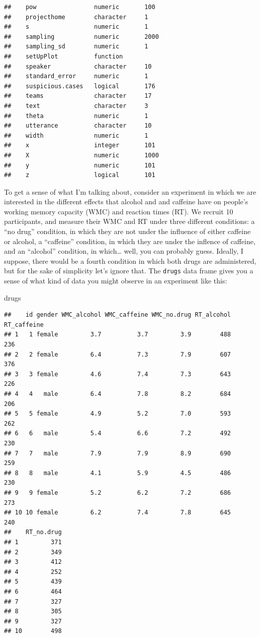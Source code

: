 \documentclass[
]{book}
\newenvironment{Shaded}{\begin{snugshade}}{\end{snugshade}}
\newcommand{\NormalTok}[1]{#1}
\begin{document}
\begin{verbatim}
##    pow                numeric       100       
##    projecthome        character     1         
##    s                  numeric       1         
##    sampling           numeric       2000      
##    sampling_sd        numeric       1         
##    setUpPlot          function                
##    speaker            character     10        
##    standard_error     numeric       1         
##    suspicious.cases   logical       176       
##    teams              character     17        
##    text               character     3         
##    theta              numeric       1         
##    utterance          character     10        
##    width              numeric       1         
##    x                  integer       101       
##    X                  numeric       1000      
##    y                  numeric       101       
##    z                  logical       101
\end{verbatim}

To get a sense of what I'm talking about, consider an experiment in which we are interested in the different effects that alcohol and and caffeine have on people's working memory capacity (WMC) and reaction times (RT). We recruit 10 participants, and measure their WMC and RT under three different conditions: a ``no drug'' condition, in which they are not under the influence of either caffeine or alcohol, a ``caffeine'' condition, in which they are under the inflence of caffeine, and an ``alcohol'' condition, in which\ldots{} well, you can probably guess. Ideally, I suppose, there would be a fourth condition in which both drugs are administered, but for the sake of simplicity let's ignore that. The \texttt{drugs} data frame gives you a sense of what kind of data you might observe in an experiment like this:

\begin{Shaded}
\begin{Highlighting}[]
\NormalTok{drugs}
\end{Highlighting}
\end{Shaded}

\begin{verbatim}
##    id gender WMC_alcohol WMC_caffeine WMC_no.drug RT_alcohol RT_caffeine
## 1   1 female         3.7          3.7         3.9        488         236
## 2   2 female         6.4          7.3         7.9        607         376
## 3   3 female         4.6          7.4         7.3        643         226
## 4   4   male         6.4          7.8         8.2        684         206
## 5   5 female         4.9          5.2         7.0        593         262
## 6   6   male         5.4          6.6         7.2        492         230
## 7   7   male         7.9          7.9         8.9        690         259
## 8   8   male         4.1          5.9         4.5        486         230
## 9   9 female         5.2          6.2         7.2        686         273
## 10 10 female         6.2          7.4         7.8        645         240
##    RT_no.drug
## 1         371
## 2         349
## 3         412
## 4         252
## 5         439
## 6         464
## 7         327
## 8         305
## 9         327
## 10        498
\end{verbatim}
\end{document}
